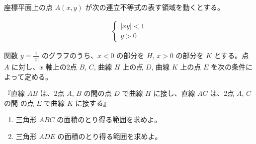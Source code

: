 座標平面上の点 $A(x,y)$ が次の連立不等式の表す領域を動くとする。

\begin{align}
  \begin{cases}
    |xy| < 1 \\
    y > 0
  \end{cases}
\end{align}

関数 $y = \frac{1}{|x|}$ のグラフのうち、$x < 0$ の部分を $H$, $x > 0$ の部分を $K$ とする。点 $A$ に対し、$x$ 軸上の2点 $B$, $C$, 曲線 $H$ 上の点 $D$, 曲線 $K$ 上の点 $E$ を次の条件によって定める。

『直線 $AB$ は、2点 $A$, $B$ の間の点 $D$ で曲線 $H$ に接し、直線 $AC$ は、2点 $A$, $C$ の間
の点 $E$ で曲線 $K$ に接する』

\begin{enumerate}
  \item 三角形 $ABC$ の面積のとり得る範囲を求めよ。
  \item 三角形 $ADE$ の面積のとり得る範囲を求めよ。
\end{enumerate}
